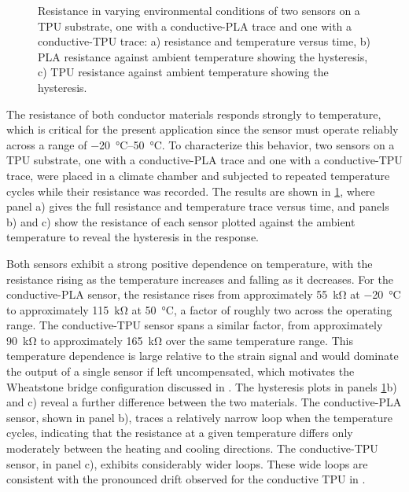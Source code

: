 \begin{figure}[!b]
\centering

    \caption{Resistance in varying environmental conditions of two sensors on a TPU substrate, one with a conductive-PLA trace and one with a conductive-TPU trace: a) resistance and temperature versus time, b) PLA resistance against ambient temperature showing the hysteresis, c) TPU resistance against ambient temperature showing the hysteresis.}
    \label{fig:TPUvsPLA_neg_deg}
\end{figure}

The resistance of both conductor materials responds strongly to temperature, which is critical for the present application since the sensor must operate reliably across a range of \SIrange{-20}{50}{\celsius}. To characterize this behavior, two sensors on a TPU substrate, one with a conductive-PLA trace and one with a conductive-TPU trace, were placed in a climate chamber and subjected to repeated temperature cycles while their resistance was recorded. The results are shown in \cref{fig:TPUvsPLA_neg_deg}, where panel a) gives the full resistance and temperature trace versus time, and panels b) and c) show the resistance of each sensor plotted against the ambient temperature to reveal the hysteresis in the response.

Both sensors exhibit a strong positive dependence on temperature, with the resistance rising as the temperature increases and falling as it decreases. For the conductive-PLA sensor, the resistance rises from approximately \SI{55}{\kilo\ohm} at \SI{-20}{\celsius} to approximately \SI{115}{\kilo\ohm} at \SI{50}{\celsius}, a factor of roughly two across the operating range. The conductive-TPU sensor spans a similar factor, from approximately \SI{90}{\kilo\ohm} to approximately \SI{165}{\kilo\ohm} over the same temperature range. This temperature dependence is large relative to the strain signal and would dominate the output of a single sensor if left uncompensated, which motivates the Wheatstone bridge configuration discussed in . 
The hysteresis plots in panels \cref{fig:TPUvsPLA_neg_deg}b) and c) reveal a further difference between the two materials. The conductive-PLA sensor, shown in panel b), traces a relatively narrow loop when the temperature cycles, indicating that the resistance at a given temperature differs only moderately between the heating and cooling directions. The conductive-TPU sensor, in panel c), exhibits considerably wider loops. These wide loops are consistent with the pronounced drift observed for the conductive TPU in .


